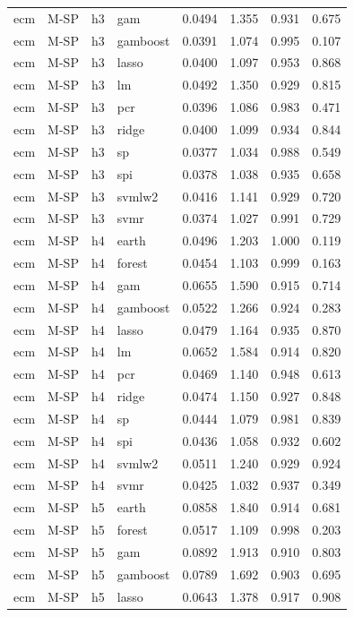 \begin{ThreePartTable}
\begin{longtable}[t]{llclcccc}
ecm & M-SP & h3 & gam & 0.0494 & 1.355 & 0.931 & 0.675\\
ecm & M-SP & h3 & gamboost & 0.0391 & 1.074 & 0.995 & 0.107\\
ecm & M-SP & h3 & lasso & 0.0400 & 1.097 & 0.953 & 0.868\\
ecm & M-SP & h3 & lm & 0.0492 & 1.350 & 0.929 & 0.815\\
ecm & M-SP & h3 & pcr & 0.0396 & 1.086 & 0.983 & 0.471\\
ecm & M-SP & h3 & ridge & 0.0400 & 1.099 & 0.934 & 0.844\\
ecm & M-SP & h3 & sp & 0.0377 & 1.034 & 0.988 & 0.549\\
ecm & M-SP & h3 & spi & 0.0378 & 1.038 & 0.935 & 0.658\\
ecm & M-SP & h3 & svmlw2 & 0.0416 & 1.141 & 0.929 & 0.720\\
ecm & M-SP & h3 & svmr & 0.0374 & 1.027 & 0.991 & 0.729\\
\addlinespace
ecm & M-SP & h4 & earth & 0.0496 & 1.203 & 1.000 & 0.119\\
ecm & M-SP & h4 & forest & 0.0454 & 1.103 & 0.999 & 0.163\\
ecm & M-SP & h4 & gam & 0.0655 & 1.590 & 0.915 & 0.714\\
ecm & M-SP & h4 & gamboost & 0.0522 & 1.266 & 0.924 & 0.283\\
ecm & M-SP & h4 & lasso & 0.0479 & 1.164 & 0.935 & 0.870\\
ecm & M-SP & h4 & lm & 0.0652 & 1.584 & 0.914 & 0.820\\
ecm & M-SP & h4 & pcr & 0.0469 & 1.140 & 0.948 & 0.613\\
ecm & M-SP & h4 & ridge & 0.0474 & 1.150 & 0.927 & 0.848\\
ecm & M-SP & h4 & sp & 0.0444 & 1.079 & 0.981 & 0.839\\
ecm & M-SP & h4 & spi & 0.0436 & 1.058 & 0.932 & 0.602\\
ecm & M-SP & h4 & svmlw2 & 0.0511 & 1.240 & 0.929 & 0.924\\
ecm & M-SP & h4 & svmr & 0.0425 & 1.032 & 0.937 & 0.349\\
\addlinespace
ecm & M-SP & h5 & earth & 0.0858 & 1.840 & 0.914 & 0.681\\
ecm & M-SP & h5 & forest & 0.0517 & 1.109 & 0.998 & 0.203\\
ecm & M-SP & h5 & gam & 0.0892 & 1.913 & 0.910 & 0.803\\
ecm & M-SP & h5 & gamboost & 0.0789 & 1.692 & 0.903 & 0.695\\
ecm & M-SP & h5 & lasso & 0.0643 & 1.378 & 0.917 & 0.908\\

\end{longtable}
\end{ThreePartTable}
